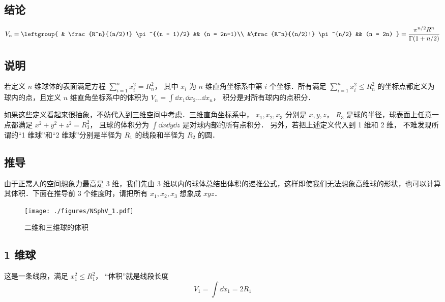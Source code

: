 
\subsection{结论}
\begin{equation}
V_n = \leftgroup{
& \frac{R^n}{(n/2)!} \pi^{(n - 1)/2} && (n = 2n-1)\\
&\frac{R^n}{(n/2)!} \pi^{n/2} && (n = 2n)
} = \frac{\pi^{n/2} R^n}{\Gamma (1 + n/2)}
\end{equation}
 
\subsection{说明}
若定义 $n$ 维球体的表面满足方程 $\sum_{i=1}^n x_i^2 = R_n^2$， 其中 $x_i$ 为 $n$ 维直角坐标系中第 $i$ 个坐标．所有满足 $\sum_{i=1}^n x_i^2 \leqslant R_n^2$ 的坐标点都定义为球内的点，且定义 $n$ 维直角坐标系中的体积为 $V_n = \int \dd{x_1}\dd{x_2}\dots\dd{x_n}$， 积分是对所有球内的点积分．

如果这些定义看起来很抽象，不妨代入到三维空间中考虑．三维直角坐标系中， $x_1, x_2, x_3$ 分别是 $x,y,z$，  $R_3$ 是球的半径，球表面上任意一点都满足 $x^2 + y^2 + z^2 = R_3^2$， 且球的体积分为 $\int \dd{x}\dd{y}\dd{z}$ 是对球内部的所有点积分． 另外，若把上述定义代入到 1 维和 2 维， 不难发现所谓的“1 维球”和“2 维球”分别是半径为 $R_1$ 的线段和半径为 $R_2$ 的圆．

\subsection{推导}
由于正常人的空间想象力最高是 3 维，我们先由 3 维以内的球体总结出体积的递推公式，这样即使我们无法想象高维球的形状，也可以计算其体积．下面在推导前 3 个维度时，请把所有 $x_1, x_2, x_3$ 想象成 $xyz$． 
\begin{figure}[ht]
\centering
\texttt{[image: ./figures/NSphV\_1.pdf]}
\caption{二维和三维球的体积}
\end{figure}
\subsection{1 维球}
这是一条线段，满足 $x_1^2 \leqslant R_1^2$， “体积”就是线段长度
\begin{equation}\label{NSphV_eq1}
V_1 = \int \dd{x_1} = 2 R_1
\end{equation}
